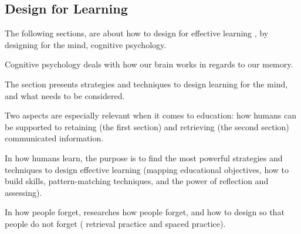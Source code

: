 \subsection{Design for Learning}


The following sections, are about how to design for effective learning \citep{dirksen}, by designing for the mind, cognitive psychology. %

Cognitive psychology deals with how our brain works in regards to our memory.

The section presents strategies and techniques to design learning for the mind, and what needs to be considered.

Two aspects are especially relevant when it comes to education: how humans can be supported to retaining (the first section) and retrieving (the second section) communicated information.

In how humans learn, the purpose is to find the most powerful strategies and techniques to design effective learning (mapping educational objectives, how to build skills, pattern-matching techniques, and the power of reflection and assessing).

In how people forget, \cite{bjork} researches how people forget, and how to design so that people do not forget ( retrieval practice and spaced practice).




